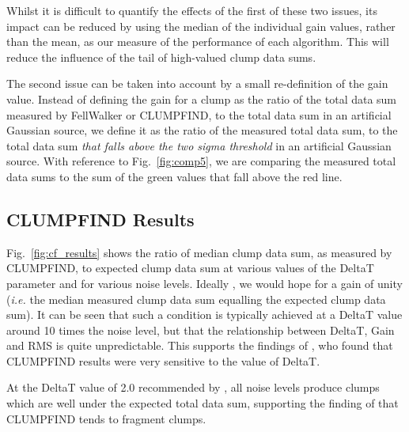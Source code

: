 \documentclass[final,authoryear,5p,times,twocolumn]{elsarticle}
\begin{document}
Whilst it is difficult to quantify the effects of the first of these two
issues, its impact can be reduced by using the median of the individual
gain values, rather than the mean, as our measure of the performance of each
algorithm. This will reduce the influence of the tail of high-valued clump
data sums.

The second issue can be taken into account by a small re-definition of
the gain value. Instead of defining the gain for a clump as the ratio of
the total data sum measured by FellWalker or CLUMPFIND, to the total data
sum in an artificial Gaussian source, we define it as the ratio of
the measured total data sum, to the total data sum \emph{that falls above the
two sigma threshold} in an artificial Gaussian source. With reference to
Fig.~\ref{fig:comp5}, we are comparing the measured total data sums to
the sum of the green values that fall above the red line.

\subsection{CLUMPFIND Results}
Fig.~\ref{fig:cf_results} shows the ratio of median clump data sum, as
measured by CLUMPFIND, to expected clump data sum at various values of
the DeltaT parameter and for various noise levels. Ideally , we would
hope for a gain of unity (\emph{i.e.} the median measured clump data sum
equalling the expected clump data sum). It can be seen that such a
condition is typically achieved at a DeltaT value around 10 times the
noise level, but that the relationship between DeltaT, Gain and RMS is
quite unpredictable. This supports the findings of \citet{2009Pineda},
who found that CLUMPFIND results were very sensitive to the value of DeltaT.

At the DeltaT value of 2.0 recommended by \citet{1994Williams}, all noise
levels produce clumps which are well under the expected total data sum,
supporting the finding of \citet{2010Watson} that CLUMPFIND tends to
fragment clumps.
\end{document}
